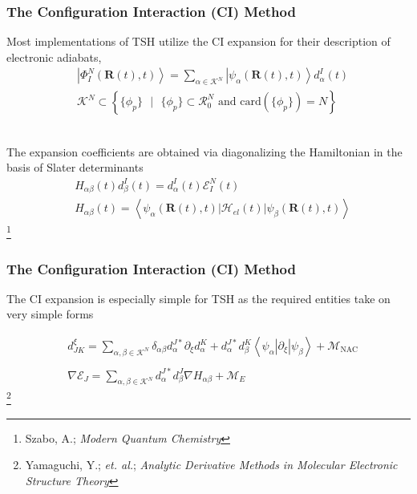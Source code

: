 \documentclass[usepdftitle=false,10pt]{beamer}
\newcommand{\ket}[1]{\left\vert #1 \right\rangle}         %
\newcommand{\innerop}[3]{\left\langle #1 \left\vert #2 \right\vert #3 \right\rangle}  %
\newcommand*\suchthat[0]{\text{ }\vert\text{ }}
\newcommand*\vc[1]{\boldsymbol{#1}}
\newcommand\blfootnote[1]{%
  \begingroup
  \renewcommand\thefootnote{}\footnote{#1}%
  \addtocounter{footnote}{-1}%
  \endgroup
}
\begin{document}
\begin{frame}
  \frametitle{The Configuration Interaction (CI) Method}

  Most implementations of TSH utilize the CI expansion for their description
  of electronic adiabats,
  \begin{align*}
  &\ket{\Phi^N_I (\vc{R}(t),t)} = \sum_{\alpha \in \mathcal{K}^N}  
    \ket{\psi_\alpha (\vc{R}(t),t)} d^I_\alpha(t)
  \\
  & \mathcal{K}^N \subset \left\lbrace \{ \phi_p \} \suchthat \{ \phi_p \} \subset
  \mathcal{R}_0^N \text{ and } \mathrm{card}(\{ \phi_p \}) = N \right\rbrace
  \end{align*}
  
  ~\\
  The expansion coefficients are obtained via diagonalizing the Hamiltonian
  in the basis of Slater determinants
  \begin{align*}
  &H_{\alpha\beta}(t) d_\beta^I(t) = d_\alpha^I(t) \mathcal{E}^N_I(t)
  \\
  &H_{\alpha\beta}(t) =
  \innerop{\psi_\alpha(\vc{R}(t),t)}{\mathcal{H}_{el}(t)}{\psi_\beta(\vc{R}(t),t)}
  \end{align*}
  \blfootnote{\tiny Szabo, A.; \emph{Modern Quantum Chemistry}}
\end{frame}

\begin{frame}
  \frametitle{The Configuration Interaction (CI) Method}

  The CI expansion is especially simple for TSH as the required entities take on
  very simple forms

  \begin{align*}
    &d_{JK}^\xi = \sum_{\alpha,\beta \in \mathcal{K}^N} 
      \delta_{\alpha\beta} d_\alpha^{J*} \partial_\xi d_\alpha^K +
      d_\alpha^{J*} d_\beta^K 
      \innerop{\psi_\alpha}{\partial_\xi}{\psi_\beta} +
      \mathcal{M}_\mathrm{NAC} \\ \\
    &\nabla \mathcal{E}_J = \sum_{\alpha,\beta \in \mathcal{K}^N} 
      d_\alpha^{J*} d_\beta^J \nabla H_{\alpha\beta} +
      \mathcal{M}_E
  \end{align*}
  \blfootnote{\tiny Yamaguchi, Y.; \emph{et. al.}; \emph{Analytic Derivative Methods in Molecular Electronic Structure Theory}}
\end{frame}
\end{document}
